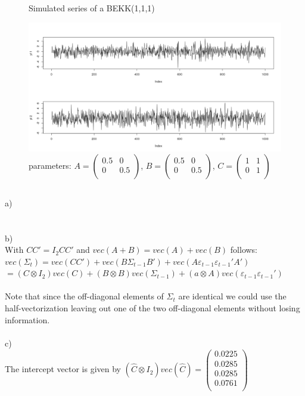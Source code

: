 \documentclass[11pt]{article}
\begin{document}
\begin{figure}[hc]
\centering
\caption{Simulated series of a BEKK(1,1,1)}
\caption*{parameters: $A = \begin{pmatrix} 
0.5 & 0 \\
0 & 0.5 \\
\end{pmatrix}$, $B = \begin{pmatrix} 
0.5 & 0 \\
0 & 0.5 \\
\end{pmatrix}$, $C = \begin{pmatrix} 
1 & 1 \\
0 & 1 \\
\end{pmatrix}$}
\label{correlogram1}
\includegraphics[width=160mm]{graphs/problem2_simulated_series.png}
\end{figure}
\clearpage

\subsection{}
a) \\
\\
\\
b) \\
With $CC' = I_2CC'$ and $vec(A+B) = vec(A) + vec(B)$ follows: \\
$vec(\Sigma_t) = vec(CC') + vec(B\Sigma_{t-1}B') + vec(A\varepsilon_{t-1}\varepsilon_{t-1}'A')$ \\ $ = (C \otimes I_2 )vec(C) + (B \otimes B)vec(\Sigma_{t-1}) + (a \otimes A)vec(\varepsilon_{t-1}\varepsilon_{t-1}')$
\\
\\
Note that since the off-diagonal elements of $\Sigma_t$ are identical we could use the half-vectorization leaving out one of the two off-diagonal elements without losing information.
\\
\\
c) \\
The intercept vector is given by $(\hat C \otimes I_2)vec(\hat C) = \begin{pmatrix} 0.0225 \\ 0.0285 \\ 0.0285 \\ 0.0761 \\ \end{pmatrix}$



\end{document}
